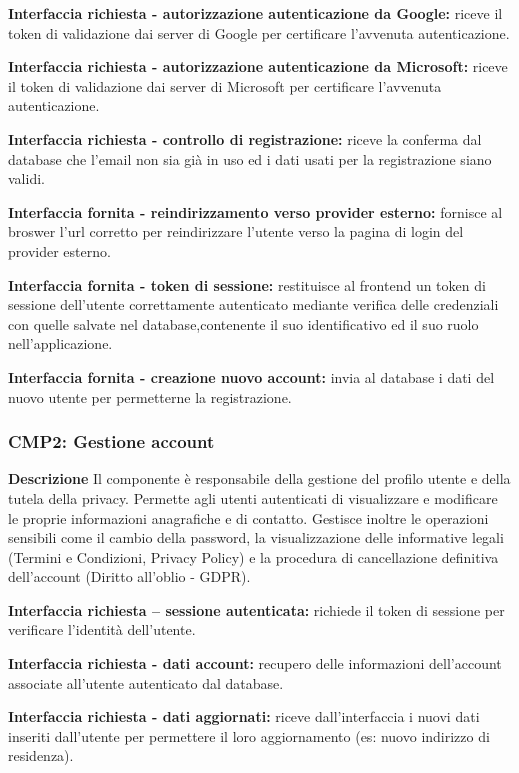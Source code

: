 \textbf{Interfaccia richiesta - autorizzazione autenticazione da Google:}
riceve il token di validazione dai server di Google per certificare l'avvenuta autenticazione.

\textbf{Interfaccia richiesta - autorizzazione autenticazione da Microsoft:}
riceve il token di validazione dai server di Microsoft per certificare l'avvenuta autenticazione.

\textbf{Interfaccia richiesta - controllo di registrazione:}
riceve la conferma dal database che l'email non sia già in uso ed i dati usati per la registrazione siano validi.

\textbf{Interfaccia fornita - reindirizzamento verso provider esterno:}
fornisce al broswer l'url corretto per reindirizzare l'utente verso la pagina di login del provider
esterno.

\textbf{Interfaccia fornita - token di sessione:}
restituisce al frontend un token di sessione dell'utente correttamente autenticato
mediante verifica delle credenziali con quelle salvate nel database,contenente il suo
identificativo ed il suo ruolo nell'applicazione.

\textbf{Interfaccia fornita - creazione nuovo account:}
invia al database i dati del nuovo utente per permetterne la registrazione.

\subsubsection*{CMP2: Gestione account}
\textbf{Descrizione} Il componente è responsabile della gestione del profilo utente e
della tutela della privacy. Permette agli utenti autenticati di visualizzare e modificare
le proprie informazioni anagrafiche e di contatto. Gestisce inoltre le operazioni sensibili
come il cambio della password, la visualizzazione delle informative legali (Termini e
Condizioni, Privacy Policy) e la procedura di cancellazione definitiva dell'account (Diritto
all'oblio - GDPR).

\textbf{Interfaccia richiesta – sessione autenticata:}
richiede il token di sessione per verificare l'identità dell'utente.

\textbf{Interfaccia richiesta - dati account:}
recupero delle informazioni dell'account associate all'utente autenticato dal database.

\textbf{Interfaccia richiesta - dati aggiornati:}
riceve dall'interfaccia i nuovi dati inseriti dall'utente per permettere il loro aggiornamento
(es: nuovo indirizzo di residenza).

